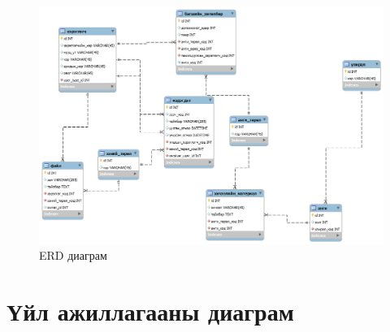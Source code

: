 \begin{figure}[!h]
	\centering
	\includegraphics[scale=0.3]{Diagrams/S}
	\caption[ERD диаграм]{ERD диаграм}
	\label{fig:SClass}
\end{figure}



\section{Үйл ажиллагааны диаграм}

